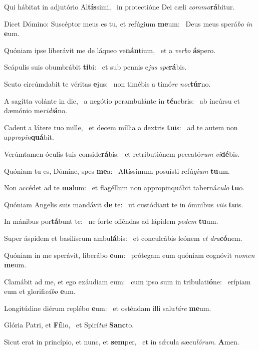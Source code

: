 \item Qui hábitat in adjutório Al\textbf{tís}simi,~\psstar{} in protectióne Dei cæli \textit{commo}\textbf{rá}bitur.
\item Dicet Dómino: Suscéptor meus es tu, et refúgium \textbf{me}um:~\psstar{} Deus meus sperá\textit{bo} \textit{in} \textbf{e}um.
\item Quóniam ipse liberávit me de láqueo ve\textbf{nán}tium,~\psstar{} et a \textit{verbo} \textbf{ás}pero.
\item Scápulis suis obumbrábit \textbf{ti}bi:~\psstar{} et sub pennis e\textit{jus} \textit{spe}\textbf{rá}bis.
\item Scuto circúmdabit te véritas \textbf{e}jus:~\psstar{} non timébis a timó\textit{re} \textit{noc}\textbf{túr}no.
\item A sagítta volánte in die,~\pscross{} a negótio perambulánte in \textbf{té}nebris:~\psstar{} ab incúrsu et dæmónio me\textit{ridi}\textbf{á}no.
\item Cadent a látere tuo mille,~\pscross{} et decem míllia a dextris \textbf{tu}is:~\psstar{} ad te autem non ap\textit{propin}\textbf{quá}bit.
\item Verúmtamen óculis tuis conside\textbf{rá}bis:~\psstar{} et retributiónem peccató\textit{rum} \textit{vi}\textbf{dé}bis.
\item Quóniam tu es, Dómine, spes \textbf{me}a:~\psstar{} Altíssimum posuísti refú\textit{gium} \textbf{tu}um.
\item Non accédet ad te \textbf{ma}lum:~\psstar{} et flagéllum non appropinquábit taberná\textit{culo} \textbf{tu}o.
\item Quóniam Angelis suis mandávit \textbf{de} te:~\psstar{} ut custódiant te in ómnibus \textit{viis} \textbf{tu}is.
\item In mánibus por\textbf{tá}bunt te:~\psstar{} ne forte offéndas ad lápidem \textit{pedem} \textbf{tu}um.
\item Super áspidem et basilíscum ambu\textbf{lá}bis:~\psstar{} et conculcábis leónem \textit{et} \textit{dra}\textbf{có}nem.
\item Quóniam in me sperávit, liberábo \textbf{e}um:~\psstar{} prótegam eum quóniam cognóvit \textit{nomen} \textbf{me}um.
\item Clamábit ad me, et ego exáudiam eum:~\pscross{} cum ipso sum in tribulati\textbf{ó}ne:~\psstar{} erípiam eum et glorifi\textit{cábo} \textbf{e}um.
\item Longitúdine diérum replébo \textbf{e}um:~\psstar{} et osténdam illi salu\textit{táre} \textbf{me}um.
\item Glória Patri, et \textbf{Fí}lio,~\psstar{} et Spirí\textit{tui} \textbf{Sanc}to.
\item Sicut erat in princípio, et nunc, et \textbf{sem}per,~\psstar{} et in sǽcula sæcu\textit{lórum}. \textbf{A}men.
